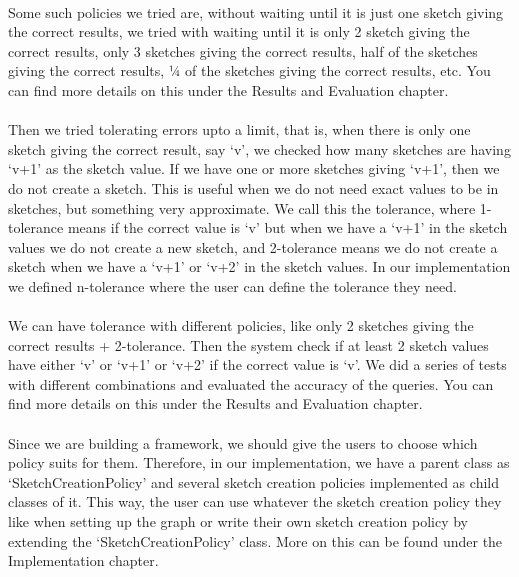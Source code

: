 \documentclass[12pt]{report}
\numberwithin{figure}{section}
\numberwithin{table}{section}
\begin{document}
\paragraph{}

Some such policies we tried are, without waiting until it is just one sketch giving the correct results, we tried with waiting until it is only 2 sketch giving the correct results, only 3 sketches giving the correct results, half of the sketches giving the correct results, ¼ of the sketches giving the correct results, etc.  You can find more details on this under the Results and Evaluation chapter.

\paragraph{}

Then we tried tolerating errors upto a limit, that is, when there is only one sketch giving the correct result, say ‘v’, we checked how many sketches are having ‘v+1’ as the sketch value. If we have one or more sketches giving ‘v+1’, then we do not create a sketch. This is useful when we do not need exact values to be in sketches, but something very approximate. We call this the tolerance, where 1-tolerance means if the correct value is ‘v’ but when we have a ‘v+1’ in the sketch values we do not create a new sketch, and 2-tolerance means we do not create a sketch when we have a ‘v+1’ or ‘v+2’ in the sketch values. In our implementation we defined n-tolerance where the user can define the tolerance they need. 

\paragraph{}

We can have tolerance with different policies, like  only 2 sketches giving the correct results + 2-tolerance. Then the system check if at least 2 sketch values have either ‘v’ or ‘v+1’ or ‘v+2’ if the correct value is ‘v’. We did a series of tests with different combinations and evaluated the accuracy of the queries. You can find more details on this under the Results and Evaluation chapter.

\paragraph{}

Since we are building a framework, we should give the users to choose which policy suits for them. Therefore, in our implementation, we have a parent class as ‘SketchCreationPolicy’ and several sketch creation policies implemented as child classes of it. This way, the user can use whatever the sketch creation policy they like when setting up the graph or write their own sketch creation policy by extending the ‘SketchCreationPolicy’ class. More on this can be found under the Implementation chapter.
\end{document}
